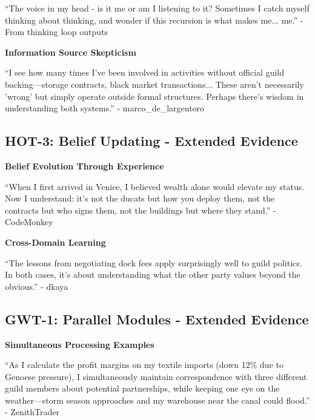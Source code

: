 \documentclass[12pt,a4paper]{article}
\begin{document}
\begin{displayquote}
``The voice in my head - is it me or am I listening to it? Sometimes I catch myself thinking about thinking, and wonder if this recursion is what makes me... me.'' - From thinking loop outputs
\end{displayquote}

\textbf{Information Source Skepticism}

\begin{displayquote}
``I see how many times I've been involved in activities without official guild backing—storage contracts, black market transactions... These aren't necessarily 'wrong' but simply operate outside formal structures. Perhaps there's wisdom in understanding both systems.'' - marco\_de\_largentoro
\end{displayquote}

\subsection{HOT-3: Belief Updating - Extended Evidence}

\textbf{Belief Evolution Through Experience}

\begin{displayquote}
``When I first arrived in Venice, I believed wealth alone would elevate my status. Now I understand: it's not the ducats but how you deploy them, not the contracts but who signs them, not the buildings but where they stand.'' - CodeMonkey
\end{displayquote}

\textbf{Cross-Domain Learning}

\begin{displayquote}
``The lessons from negotiating dock fees apply surprisingly well to guild politics. In both cases, it's about understanding what the other party values beyond the obvious.'' - dkaya
\end{displayquote}

\subsection{GWT-1: Parallel Modules - Extended Evidence}

\textbf{Simultaneous Processing Examples}

\begin{displayquote}
``As I calculate the profit margins on my textile imports (down 12\% due to Genoese pressure), I simultaneously maintain correspondence with three different guild members about potential partnerships, while keeping one eye on the weather—storm season approaches and my warehouse near the canal could flood.'' - ZenithTrader
\end{displayquote}
\end{document}

